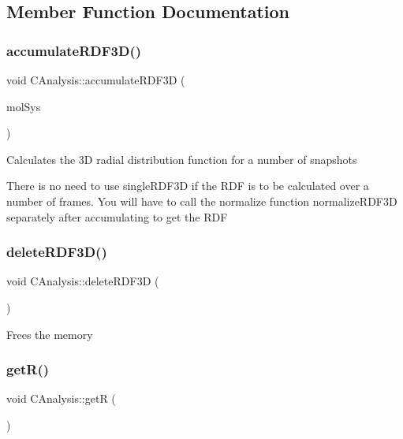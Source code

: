 \subsection{Member Function Documentation}
\mbox{\label{classCAnalysis_a3f2969c8e2e2ca69cf80de4210c27a2e}} 
\subsubsection{\texorpdfstring{accumulate\+R\+D\+F3\+D()}{accumulateRDF3D()}}
{\footnotesize\ttfamily void C\+Analysis\+::accumulate\+R\+D\+F3D (\begin{DoxyParamCaption}\item[{class \mbox{\hyperlink{classCMolecularSystem}{C\+Molecular\+System}} \&}]{mol\+Sys }\end{DoxyParamCaption})}

Calculates the 3D radial distribution function for a number of snapshots

There is no need to use single\+R\+D\+F3D if the R\+DF is to be calculated over a number of frames. You will have to call the normalize function normalize\+R\+D\+F3D separately after accumulating to get the R\+DF \mbox{\label{classCAnalysis_ae54948a0123c7ef52857e47363923500}} 
\subsubsection{\texorpdfstring{delete\+R\+D\+F3\+D()}{deleteRDF3D()}}
{\footnotesize\ttfamily void C\+Analysis\+::delete\+R\+D\+F3D (\begin{DoxyParamCaption}{ }\end{DoxyParamCaption})}

Frees the memory \mbox{\label{classCAnalysis_ac90e1a07030a0954036f4461562b0c1b}} 
\subsubsection{\texorpdfstring{get\+R()}{getR()}}
{\footnotesize\ttfamily void C\+Analysis\+::getR (\begin{DoxyParamCaption}{ }\end{DoxyParamCaption})}

